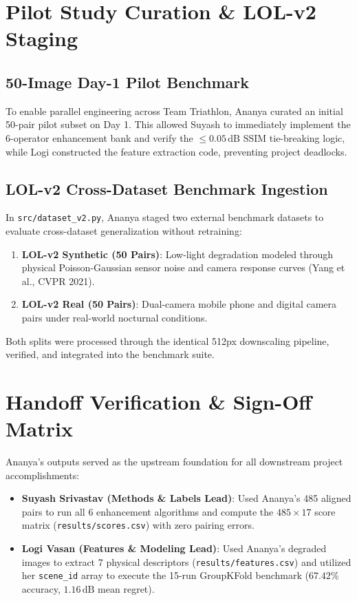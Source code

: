 \documentclass[journal]{IEEEtran}
\begin{document}
\section{Pilot Study Curation \& LOL-v2 Staging}

\subsection{50-Image Day-1 Pilot Benchmark}
To enable parallel engineering across Team Triathlon, Ananya curated an initial 50-pair pilot subset on Day 1. This allowed Suyash to immediately implement the 6-operator enhancement bank and verify the $\le 0.05\,\text{dB}$ SSIM tie-breaking logic, while Logi constructed the feature extraction code, preventing project deadlocks.

\subsection{LOL-v2 Cross-Dataset Benchmark Ingestion}
In \texttt{src/dataset\_v2.py}, Ananya staged two external benchmark datasets to evaluate cross-dataset generalization without retraining:
\begin{enumerate}
    \item \textbf{LOL-v2 Synthetic (50 Pairs)}: Low-light degradation modeled through physical Poisson-Gaussian sensor noise and camera response curves (Yang et al., CVPR 2021).
    \item \textbf{LOL-v2 Real (50 Pairs)}: Dual-camera mobile phone and digital camera pairs under real-world nocturnal conditions.
\end{enumerate}
Both splits were processed through the identical 512px downscaling pipeline, verified, and integrated into the benchmark suite.

\section{Handoff Verification \& Sign-Off Matrix}
Ananya's outputs served as the upstream foundation for all downstream project accomplishments:
\begin{itemize}
    \item \textbf{Suyash Srivastav (Methods \& Labels Lead)}: Used Ananya's 485 aligned pairs to run all 6 enhancement algorithms and compute the $485 \times 17$ score matrix (\texttt{results/scores.csv}) with zero pairing errors.
    \item \textbf{Logi Vasan (Features \& Modeling Lead)}: Used Ananya's degraded images to extract 7 physical descriptors (\texttt{results/features.csv}) and utilized her \texttt{scene\_id} array to execute the 15-run GroupKFold benchmark ($67.42\%$ accuracy, $1.16\,\text{dB}$ mean regret).
\end{itemize}
\end{document}
